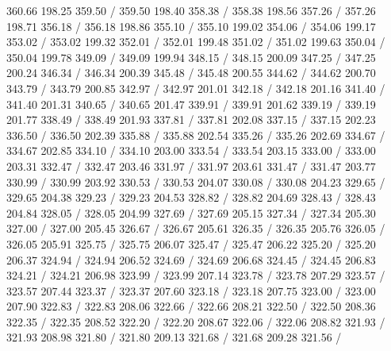 { 360.66 198.25 359.50 /
 359.50 198.40 358.38 /
 358.38 198.56 357.26 /
 357.26 198.71 356.18 /
 356.18 198.86 355.10 /
 355.10 199.02 354.06 /
 354.06 199.17 353.02 /
 353.02 199.32 352.01 /
 352.01 199.48 351.02 /
 351.02 199.63 350.04 /
 350.04 199.78 349.09 /
 349.09 199.94 348.15 /
 348.15 200.09 347.25 /
 347.25 200.24 346.34 /
 346.34 200.39 345.48 /
 345.48 200.55 344.62 /
 344.62 200.70 343.79 /
 343.79 200.85 342.97 /
 342.97 201.01 342.18 /
 342.18 201.16 341.40 /
 341.40 201.31 340.65 /
 340.65 201.47 339.91 /
 339.91 201.62 339.19 /
 339.19 201.77 338.49 /
 338.49 201.93 337.81 /
 337.81 202.08 337.15 /
 337.15 202.23 336.50 /
 336.50 202.39 335.88 /
 335.88 202.54 335.26 /
 335.26 202.69 334.67 /
 334.67 202.85 334.10 /
 334.10 203.00 333.54 /
 333.54 203.15 333.00 /
 333.00 203.31 332.47 /
 332.47 203.46 331.97 /
 331.97 203.61 331.47 /
 331.47 203.77 330.99 /
 330.99 203.92 330.53 /
 330.53 204.07 330.08 /
 330.08 204.23 329.65 /
 329.65 204.38 329.23 /
 329.23 204.53 328.82 /
 328.82 204.69 328.43 /
 328.43 204.84 328.05 /
 328.05 204.99 327.69 /
 327.69 205.15 327.34 /
 327.34 205.30 327.00 /
 327.00 205.45 326.67 /
 326.67 205.61 326.35 /
 326.35 205.76 326.05 /
 326.05 205.91 325.75 /
 325.75 206.07 325.47 /
 325.47 206.22 325.20 /
 325.20 206.37 324.94 /
 324.94 206.52 324.69 /
 324.69 206.68 324.45 /
 324.45 206.83 324.21 /
 324.21 206.98 323.99 /
 323.99 207.14 323.78 /
 323.78 207.29 323.57 /
 323.57 207.44 323.37 /
 323.37 207.60 323.18 /
 323.18 207.75 323.00 /
 323.00 207.90 322.83 /
 322.83 208.06 322.66 /
 322.66 208.21 322.50 /
 322.50 208.36 322.35 /
 322.35 208.52 322.20 /
 322.20 208.67 322.06 /
 322.06 208.82 321.93 /
 321.93 208.98 321.80 /
 321.80 209.13 321.68 /
 321.68 209.28 321.56 /
}
